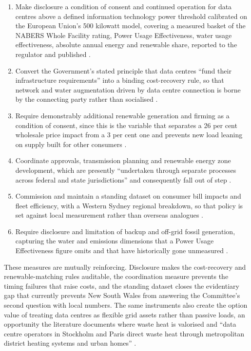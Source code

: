 \begin{enumerate}
\item Make disclosure a condition of consent and continued operation for data centres above a defined information technology power threshold calibrated on the European Union's 500 kilowatt model, covering a measured basket of the NABERS Whole Facility rating, Power Usage Effectiveness, water usage effectiveness, absolute annual energy and renewable share, reported to the regulator and published \autocite{ecEnergyPerformanceDataCentres2024, imanHiddenCostsIntelligence2025}.
\item Convert the Government's stated principle that data centres \enquote{fund their infrastructure requirements} into a binding cost-recovery rule, so that network and water augmentation driven by data centre connection is borne by the connecting party rather than socialised \autocite{inswDataCentreConsultation2026}.
\item Require demonstrably additional renewable generation and firming as a condition of consent, since this is the variable that separates a 26 per cent wholesale price impact from a 3 per cent one and prevents new load leaning on supply built for other consumers \autocite{cefcBaringaDataCentres2025, climateCouncilNSWDataCentres2026, greenpeaceEnergyVampires2026}.
\item Coordinate approvals, transmission planning and renewable energy zone development, which are presently \enquote{undertaken through separate processes across federal and state jurisdictions} and consequently fall out of step \autocite{usscPoweringCloud2025}.
\item Commission and maintain a standing dataset on consumer bill impacts and fleet efficiency, with a Western Sydney regional breakdown, so that policy is set against local measurement rather than overseas analogues \autocite{ecaConsumerImpactsDataCentres2025}.
\item Require disclosure and limitation of backup and off-grid fossil generation, capturing the water and emissions dimensions that a Power Usage Effectiveness figure omits and that have historically gone unmeasured \autocite{climateCouncilNSWDataCentres2026, liMakingAILess2025}.
\end{enumerate}

These measures are mutually reinforcing. Disclosure makes the cost-recovery and renewable-matching rules auditable, the coordination measure prevents the timing failures that raise costs, and the standing dataset closes the evidentiary gap that currently prevents New South Wales from answering the Committee's second question with local numbers. The same instruments also create the option value of treating data centres as flexible grid assets rather than passive loads, an opportunity the literature documents where waste heat is valorised and \enquote{data centre operators in Stockholm and Paris direct waste heat through metropolitan district heating systems and urban homes} \autocite{velkovaDataThatWarms2016}.

